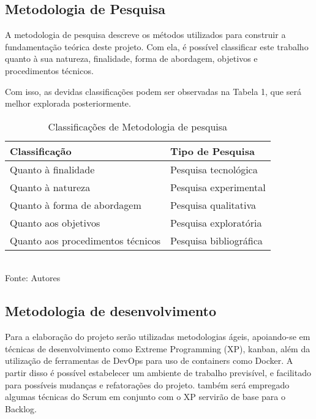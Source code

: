 \subsection{Metodologia de Pesquisa}

A metodologia de pesquisa descreve os métodos utilizados para construir a fundamentação teórica deste projeto. Com ela, é possível classificar este trabalho quanto à sua natureza, finalidade, forma de abordagem, objetivos e procedimentos técnicos.

Com isso, as devidas classificações podem ser observadas na Tabela 1, que será melhor explorada posteriormente.

\setlength{\extrarowheight}{5pt}

\begin{table}
    \centering
    \caption{Classificações de Metodologia de pesquisa}
    \begin{tabular}{|l|l|}
        \hline
        \textbf{Classificação}            & \textbf{Tipo de Pesquisa}\\ 
        \hline
        Quanto à finalidade               & Pesquisa tecnológica \\ 
        \hline
        Quanto à natureza                 & Pesquisa experimental \\ 
        \hline
        Quanto à forma de abordagem       & Pesquisa qualitativa \\
        \hline
        Quanto aos objetivos              & Pesquisa exploratória \\
        \hline
        Quanto aos procedimentos técnicos & Pesquisa bibliográfica \\        
        \hline
    \end{tabular}
    \label{tab:tipo_pesquisa}
    \vspace{5mm} \\ 
    {\footnotesize Fonte: Autores} 
\end{table}

\subsection{Metodologia de desenvolvimento}

Para a elaboração do projeto serão utilizadas metodologias ágeis, apoiando-se em técnicas de desenvolvimento como Extreme Programming (XP), kanban, além da utilização de ferramentas de DevOps para uso de containers como Docker. A partir disso é possível estabelecer um ambiente de trabalho previsível, e facilitado para possíveis mudanças e refatorações do projeto. também será empregado algumas técnicas do Scrum em conjunto com o XP servirão de base para o Backlog.


